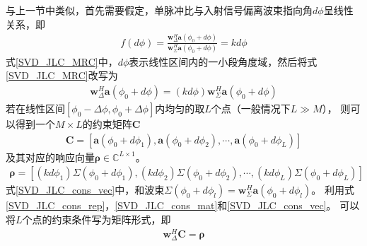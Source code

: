 \documentclass[master]{thesis-uestc}
\begin{document}
与上一节中类似，首先需要假定，单脉冲比与入射信号偏离波束指向角$d\phi$呈线性关系，即
\begin{equation}\label{SVD_JLC_MRC}
    \begin{aligned}
        f(d\phi) = \frac{\bm{w}^H_\Delta\bm{a}(\phi_0+d\phi)}
        {\bm{w}^H_\Sigma\bm{a}(\phi_0+d\phi)} = kd\phi
    \end{aligned}
\end{equation}
式\eqref{SVD_JLC_MRC}中，$d\phi$表示线性区间内的一小段角度域，然后将式\eqref{SVD_JLC_MRC}改写为
\begin{equation}\label{SVD_JLC_cons_rep}
    \begin{aligned}
        \bm{w}_{\Delta}^{H} \bm{a}\left(\phi_0+d \phi\right)=
        (k d \phi) \bm{w}_{\Sigma}^{H} \bm{a}\left(\phi_0+d \phi\right)
    \end{aligned}
\end{equation}
若在线性区间$\left[\phi_0-\Delta\phi,\phi_0+\Delta\phi\right]$内均匀的取$L$个点（一般情况下$L \gg M$），
则可以得到一个$M \times L$的约束矩阵$\bm{C}$
\begin{equation}\label{SVD_JLC_cons_mat}
    \begin{aligned}
        \bm{C}=
        \left[
            \bm{a}\left(\phi_{0}+d \phi_{1}\right), 
            \bm{a}\left(\phi_{0}+d \phi_{2}\right), \cdots, 
            \bm{a}\left(\phi_{0}+d \phi_{L}\right)
        \right]
    \end{aligned}
\end{equation}
及其对应的响应向量$\bm{\rho}\in\mathbb{C}^{L\times1}$。
\begin{equation}\label{SVD_JLC_cons_vec}
    \begin{aligned}
        \bm{\rho}=
        \left[
            \left(k d \phi_{1}\right) \Sigma\left(\phi_{0}+d \phi_{1}\right),
            \left(k d \phi_{2}\right) \Sigma\left(\phi_{0}+d \phi_{2}\right), \cdots,
            \left(k d \phi_{L}\right) \Sigma\left(\phi_{0}+d \phi_{L}\right)
        \right]
    \end{aligned}
\end{equation}
式\eqref{SVD_JLC_cons_vec}中，和波束$\Sigma(\phi_0+d\phi_l)=\bm{w}^H_\Sigma\bm{a}(\phi_0+d\phi_l)$。
利用式\eqref{SVD_JLC_cons_rep}，\eqref{SVD_JLC_cons_mat}和\eqref{SVD_JLC_cons_vec}。
可以将$L$个点的约束条件写为矩阵形式，即
\begin{equation}\label{SVD_JLC_cons_mat_rep}
    \begin{aligned}
        \bm{w}^H_\Delta\bm{C} = \bm{\rho}
    \end{aligned}
\end{equation}
\end{document}
